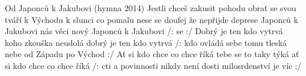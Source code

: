 \begin{TEXT}{Od Japonců k Jakubovi (hymna 2014)}
\SLOKA[] Jestli chceš zakusit pohodu\NL
obra\v{t} se svou tváří k Východu\NL
k slunci co pomalu nese se\NL
doufej že nepřijde deprese
\SLOKA {} Japonců k Jakubovi\NL
{} nás věci nový\NL
{} Japonců k Jakubovi\NL
/:  \NL
{} se \NL
{}   :/
\SLOKA Dobrý je ten kdo vytrvá\NL
koho zkouška neudolá\NL
dobrý je ten kdo vytrvá\NL
/: kdo ovládá sebe\NL
tomu tleská nebe\NL
od Západu po Východ :/
\SLOKA A\v{t} si kdo chce co chce říká\NL
tebe se to taky týká\NL
a\v{t} si kdo chce co chce říká\NL
/: cti a povinnosti\NL
nikdy není dosti\NL
milosrdenství je víc :/
\end{TEXT}
